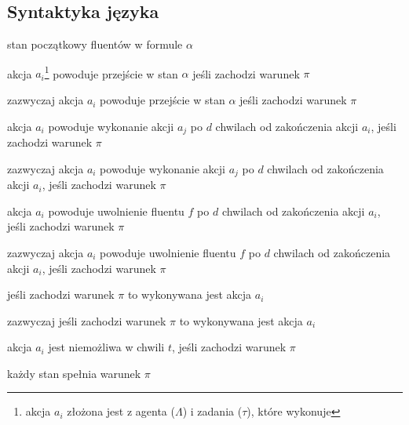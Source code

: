 \subsection{Syntaktyka języka}
\begin{description}[style=nextline]
	\item[$\texttt{initially } \alpha$]
	stan początkowy fluentów w formule $\alpha$
	\item[$a_i \texttt{ causes } \alpha \texttt{ if } \pi$]
	akcja $a_i$\footnote{akcja $a_i$ złożona jest z agenta ($\Lambda$) i zadania ($\tau$), które wykonuje}
	powoduje przejście w stan $\alpha$ jeśli zachodzi warunek $\pi$
	\item[$\texttt{typically } a_i \texttt{ causes } \alpha \texttt{ if } \pi$]
	zazwyczaj akcja $a_i$ powoduje przejście w stan $\alpha$ jeśli zachodzi warunek $\pi$
	\item[$a_i \texttt{ invokes } a_j \texttt{ after } d \texttt{ if } \pi$]
	akcja $a_i$ powoduje wykonanie akcji $a_j$ po $d$ chwilach od zakończenia akcji $a_i$,
	jeśli zachodzi warunek $\pi$
	\item[$\texttt{typically } a_i \texttt{ invokes } a_j \texttt{ after } d \texttt{ if } \pi$]
	zazwyczaj akcja $a_i$ powoduje wykonanie akcji $a_j$ po $d$ chwilach od zakończenia akcji $a_i$,
	jeśli zachodzi warunek $\pi$
	\item[$a_i \texttt{ releases } f \texttt{ after } d \texttt{ if } \pi$]
	akcja $a_i$ powoduje uwolnienie fluentu $f$ po $d$ chwilach od zakończenia akcji $a_i$,
	jeśli zachodzi warunek $\pi$
	\item[$\texttt{typically } a_i \texttt{ releases } f \texttt{ after } d \texttt{ if } \pi$]
	zazwyczaj akcja $a_i$ powoduje uwolnienie fluentu $f$ po $d$ chwilach od zakończenia akcji $a_i$,
	jeśli zachodzi warunek $\pi$
	\item[$\pi \texttt{ triggers } a_i$]
	jeśli zachodzi warunek $\pi$	to wykonywana jest akcja $a_i$
	\item[$\texttt{typically }\pi \texttt{ triggers } a_i$]
	zazwyczaj jeśli zachodzi warunek $\pi$ to wykonywana jest akcja $a_i$
	\item[$\texttt{impossible } a_i \texttt{ at } t \texttt{ if } \pi$]
	akcja $a_i$ jest niemożliwa  w chwili $t$, jeśli zachodzi warunek $\pi$
	\item[$\texttt{always } \pi$]
	każdy stan spełnia warunek $\pi$
\end{description}


